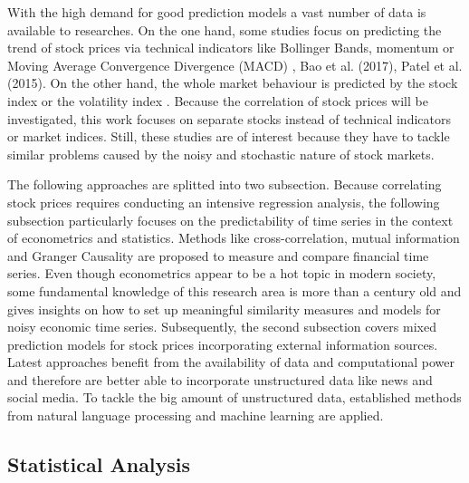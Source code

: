 With the high demand for good prediction models a vast number of data is available to researches. On the one hand, some studies focus on predicting the trend of stock prices via technical indicators like Bollinger Bands, momentum or Moving Average Convergence Divergence (MACD) \cite{Lee2014OnPrediction, Li2014NewsAnalysis, Yoshihara2014PredictingNetworks, Akita2016DeepInformation}, Bao et al. (2017), Patel et al. (2015). On the other hand, the whole market behaviour is predicted by the stock index or the volatility index \cite{Yang2002SupportPrediction, Bollen2011TwitterMarket, Zhang2011PredictingFear, Ding2014UsingInvestigation, Xiong2015DeepTrends}. Because the correlation of stock prices will be investigated, this work focuses on separate stocks instead of technical indicators or market indices. Still, these studies are of interest because they have to tackle similar problems caused by the noisy and stochastic nature of stock markets. 

The following approaches are splitted into two subsection. Because correlating stock prices requires conducting an intensive regression analysis, the following subsection particularly focuses on the predictability of time series in the context of econometrics and statistics. Methods like cross-correlation, mutual information and Granger Causality are proposed to measure and compare financial time series. Even though econometrics appear to be a hot topic in modern society, some fundamental knowledge of this research area is more than a century old and gives insights on how to set up meaningful similarity measures and models for noisy economic time series. Subsequently, the second subsection covers mixed prediction models for stock prices incorporating external information sources. Latest approaches benefit from the availability of data and computational power and therefore are better able to incorporate unstructured data like news and social media. To tackle the big amount of unstructured data, established methods from natural language processing and machine learning are applied.

\subsection{Statistical Analysis}


